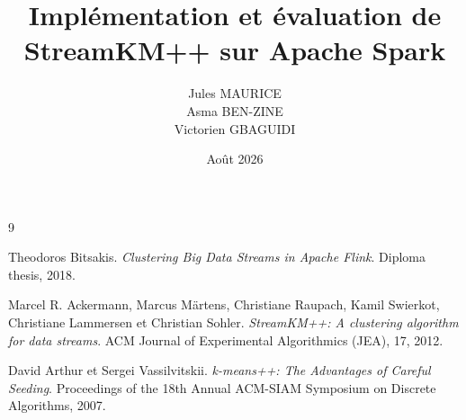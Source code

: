 \documentclass[a4paper,11pt]{report}
\title{Implémentation et évaluation de StreamKM++ sur Apache Spark}
\author{
  Jules MAURICE \\
  Asma BEN-ZINE \\
  Victorien GBAGUIDI
}
\date{Août 2026}
\begin{document}
\maketitle

\tableofcontents









\appendix


\begin{thebibliography}{9}

Theodoros Bitsakis.
\emph{Clustering Big Data Streams in Apache Flink}.
Diploma thesis, 2018.

Marcel R. Ackermann, Marcus Märtens, Christiane Raupach,
Kamil Swierkot, Christiane Lammersen et Christian Sohler.
\emph{StreamKM++: A clustering algorithm for data streams}.
ACM Journal of Experimental Algorithmics (JEA), 17, 2012.

David Arthur et Sergei Vassilvitskii.
\emph{k-means++: The Advantages of Careful Seeding}.
Proceedings of the 18th Annual ACM-SIAM Symposium on Discrete Algorithms, 2007.

\end{thebibliography}
\end{document}
